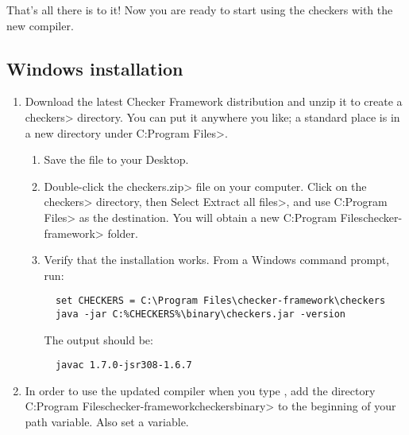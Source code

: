 That's all there is to it!  Now you are ready to start using the checkers with
the new  compiler.

\subsection{Windows installation\label{windows-installation}}

\begin{enumerate}

\item
  Download the latest Checker Framework distribution
  and unzip it to create a \<checkers> directory.  You can put it anywhere
  you like; a standard place is in a new directory under \<C:\ttbs{}Program
  Files>.

\begin{enumerate}
\item
  Save the file
  to your Desktop.
\item
  Double-click the \<checkers.zip> file on your computer.  Click on
  the \<checkers> directory, then Select \<Extract all files>, and use
  \<C:\ttbs{}Program Files> as the destination.  You will obtain a new
  \<C:\ttbs{}Program Files\ttbs{}checker-framework> folder.
\item
  Verify that the installation works.  From a Windows command prompt, run:

\begin{Verbatim}
  set CHECKERS = C:\Program Files\checker-framework\checkers
  java -jar C:%CHECKERS%\binary\checkers.jar -version
\end{Verbatim}

The output should be:

\begin{Verbatim}
  javac 1.7.0-jsr308-1.6.7
\end{Verbatim}

\end{enumerate}


\item
  In order to use the updated compiler when you type , add the
  directory \<C:\ttbs{}Program Files\ttbs{}checker-framework\ttbs{}checkers\ttbs{}binary> to the
  beginning of your path variable.  Also set a  variable.



\end{enumerate}
